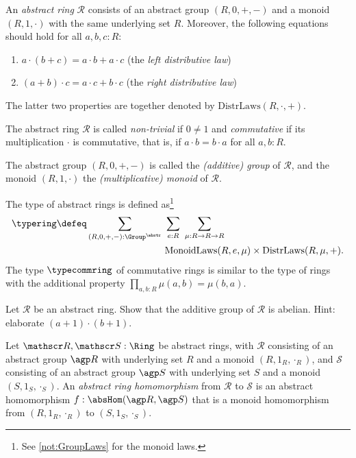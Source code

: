 \begin{definition}\label{def:abstractring}
An \emph{abstract ring} $\mathscr R$ consists of an abstract group 
$(R,0,+,-)$ and a monoid $(R,1,\cdot)$ with the
same underlying set $R$. Moreover, the following equations should hold
for all $a,b,c : R$:
    \begin{enumerate}      %
    \item\label{ring:ldistr-law} $a \cdot (b + c) = a \cdot b + a \cdot c$ (the \emph{left distributive law})
    \item\label{ring:rdistr-law} $(a + b) \cdot  c = a \cdot c + b \cdot c$ (the \emph{right distributive law})
    \end{enumerate}
The latter two properties
are together denoted by $\mathrm{DistrLaws}(R,\cdot,+)$.

The abstract ring $\mathscr R$ is called \emph{non-trivial} if $0\neq 1$
and \emph{commutative} if its multiplication $\cdot$ is commutative, that is,
if $a\cdot b= b\cdot a$ for all $a,b:R$.
\end{definition}

The abstract group $(R,0,+,-)$ is called the \emph{(additive) group}
of $\mathscr R$, and the monoid $(R,1,\cdot)$ the 
\emph{(multiplicative) monoid} of $\mathscr R$.

\begin{definition}\label{def:typering}
The type of abstract rings is defined as\footnote{%
See \cref{not:GroupLaws} for the monoid laws.}
\begin{align*}
\typering\defeq 
\sum_{(R,0,+,-):\Group^{\abstr}} ~ &\sum_{e:R} ~ \sum_{\mu:R\to R\to R} \\
&\mathrm{MonoidLaws}(R,e,\mu)\times\mathrm{DistrLaws}(R,\mu,+).
\end{align*}
The type $\typecommring$ of commutative rings is similar to the type
of rings with the additional property $\prod_{a,b:R}\mu(a,b)=\mu(b,a)$. 
\end{definition}

\begin{xca}\label{xca:ring-group-abelian}
Let $\mathscr R$ be an abstract ring. Show that the additive group 
of $\mathscr R$ is abelian. Hint: elaborate $(a+1)\cdot(b+1)$.
\end{xca}

\begin{definition}\label{def:ringhom}
Let $\mathscr R,\mathscr S : \Ring$ be abstract rings, with
$\mathscr R$ consisting of an abstract group $\agp R$ with underlying set $R$
and a monoid $(R,1_R,\cdot_R)$, and 
$\mathscr S$ consisting of an abstract group $\agp S$ with underlying set $S$
and a monoid $(S,1_S,\cdot_S)$.
An \emph{abstract ring homomorphism} from $\mathscr R$ to $\mathscr S$ is an
abstract homomorphism $f:\absHom(\agp R,\agp S)$ that is a monoid homomorphism
from $(R,1_R,\cdot_R)$ to $(S,1_S,\cdot_S)$.
\end{definition}



